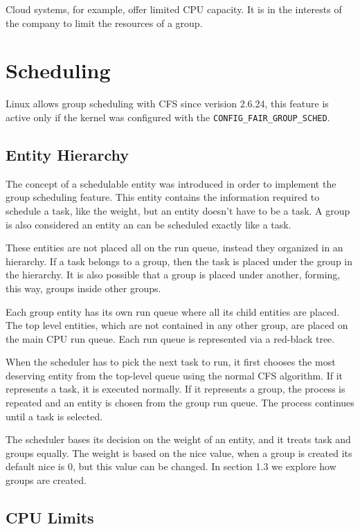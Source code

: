 Cloud systems, for example, offer limited CPU capacity. It is in the interests of the company to limit the resources of a group.

\section{Scheduling}

Linux allows group scheduling with CFS since verision 2.6.24, this feature is active only if the kernel was configured with the \verb|CONFIG_FAIR_GROUP_SCHED|.
\subsection{Entity Hierarchy}

The concept of a schedulable entity was introduced in order to implement the group scheduling feature. This entity contains the information required to schedule a task, like the weight, but an entity doesn't have to be a task. A group is also considered an entity an can be scheduled exactly like a task.

These entities are not placed all on the run queue, instead they organized in an hierarchy. If a task belongs to a group, then the task is placed under the group in the hierarchy. It is also possible that a group is placed under another, forming, this way, groups inside other groups.

Each group entity has its own run queue where all its child entities are placed. The top level entities, which are not contained in any other group, are placed on the main CPU run queue. Each run queue is represented via a red-black tree.

When the scheduler has to pick the next task to run, it first chooses the most deserving entity from the top-level queue using the  normal CFS algorithm. If it represents a task, it is executed normally. If it represents a group, the process is repeated and an entity is chosen from the group run queue. The process continues until a task is selected. 

The scheduler bases its decision on the weight of an entity, and it treats task and groups equally. The weight is based on the nice value, when a group is created its default nice is 0, but this value can be changed. In section 1.3 we explore how groups are created.

\subsection{CPU Limits}%

